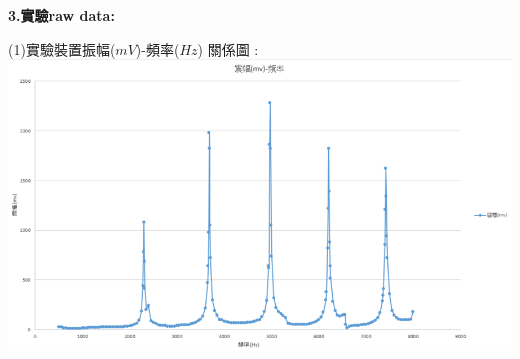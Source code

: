 \documentclass[UTF8]{ctexart}
\begin{document}
\begin{CJK*}{UTF8}{song}
\begin{large}
\textbf{3.實驗raw data:} \\
\end{large} 
(1)實驗裝置振幅($mV$)-頻率($Hz$) 關係圖 :\\ 
\includegraphics[width = .9\textwidth]{exp1.png}  \\  %
 \\
\newpage %


\end{CJK*}
\end{document}

